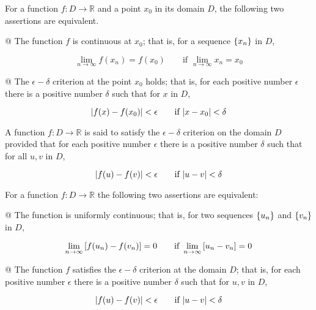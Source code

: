     \begin{thm}
        For a function $f:D\to\mathbb{R}$ and a point $x_0$ in its domain $D$, the following two assertions are
        equivalent.

        \begin{easylist}[enumerate]
            @ The function $f$ is continuous at $x_0$; that is, for a sequence ${\left\{ x_n \right\}}$ in $D$,

            \[
                \lim_{n\to\infty} f(x_n) = f(x_0) \qquad \text{if } \lim_{n\to\infty} x_n = x_0
            \]

            @ The $\epsilon-\delta$ criterion at the point $x_0$ holds; that is, for each positive number $\epsilon$
            there is a positive number $\delta$ such that for $x$ in $D$,

            \[
                {\left\lvert f(x) - f(x_0) \right\rvert} < \epsilon \qquad \text{if } {\left\lvert x - x_0 \right\rvert} < \delta
            \]
        \end{easylist}
    \end{thm}

    \begin{definition}
        A function $f:D\to\mathbb{R}$ is said to satisfy the $\epsilon-\delta$ criterion on the domain $D$ provided that
        for each positive number $\epsilon$ there is a positive number $\delta$ such that for all $u, v$ in $D$,

        \[
            {\left\lvert f(u) - f(v) \right\rvert} < \epsilon \qquad \text{if } {\left\lvert u - v \right\rvert} < \delta
        \]
    \end{definition}

    \begin{thm}
        For a function $f:D\to\mathbb{R}$ the following two assertions are equivalent:

        \begin{easylist}[enumerate]
            @ The function is uniformly continuous; that is, for two sequences ${\left\{ u_n \right\}}$ and ${\left\{ v_n \right\}}$ in $D$,

            \[
                \lim_{n\to\infty} {\left[ f(u_n) - f(v_n) \right]} = 0 \qquad \text{if } \lim_{n\to\infty} {\left[ u_n - v_n \right]} = 0
            \]

            @ The function $f$ satisfies the $\epsilon-\delta$ criterion at the domain $D$; that is, for each positive
            number $\epsilon$ there is a positive number $\delta$ such that for $u, v$ in $D$,

            \[
                {\left\lvert f(u) - f(v) \right\rvert} < \epsilon \qquad \text{if } {\left\lvert u - v \right\rvert} < \delta
            \]
        \end{easylist}
    \end{thm}

